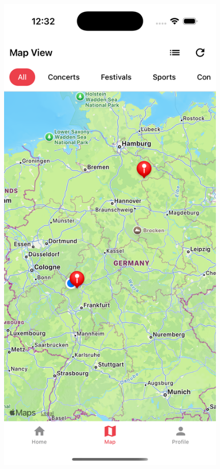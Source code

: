 \begin{figure}[htbp]
      \centering
      \vspace{1em}
      \begin{minipage}{0.48\textwidth}
            \centering
            \includegraphics[width=0.98\textwidth]{images/cursor_screenshots/final-mapscreen-cursor-3.png}

\end{minipage}
\end{figure}
